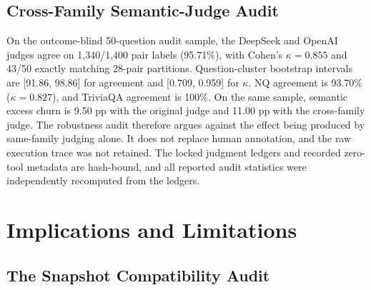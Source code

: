 \documentclass[sigconf,nonacm]{acmart}
\begin{document}
\subsection{Cross-Family Semantic-Judge Audit}

On the outcome-blind 50-question audit sample, the DeepSeek and OpenAI judges agree on 1,340/1,400 pair labels (95.71\%), with Cohen's $\kappa=0.855$ \cite{cohen1960kappa} and 43/50 exactly matching 28-pair partitions. Question-cluster bootstrap intervals are [91.86, 98.86] for agreement and [0.709, 0.959] for $\kappa$. NQ agreement is 93.70\% ($\kappa=0.827$), and TriviaQA agreement is 100\%. On the same sample, semantic excess churn is 9.50 pp with the original judge and 11.00 pp with the cross-family judge. The robustness audit therefore argues against the effect being produced by same-family judging alone. It does not replace human annotation, and the raw execution trace was not retained. The locked judgment ledgers and recorded zero-tool metadata are hash-bound, and all reported audit statistics were independently recomputed from the ledgers.

\section{Implications and Limitations}
\label{sec:discussion}

\subsection{The Snapshot Compatibility Audit}
\end{document}
